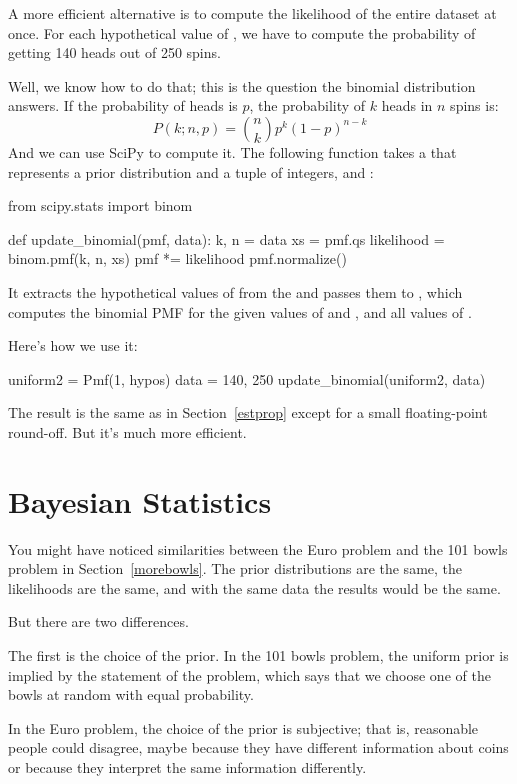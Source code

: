 \documentclass[12pt]{book}
\theoremstyle{exercise}
\begin{document}
A more efficient alternative is to compute the likelihood of the entire dataset at once.
For each hypothetical value of , we have to compute the probability of getting 140 heads out of 250 spins.

Well, we know how to do that; this is the question the binomial distribution answers.
If the probability of heads is $p$, the probability of $k$ heads in $n$ spins is:
%
\[ P(k; n, p) = \binom{n}{k} p^k (1-p)^{n-k} \]
%
And we can use SciPy to compute it.
The following function takes a  that represents a prior distribution and a tuple of integers,  and :

\begin{code}
from scipy.stats import binom

def update_binomial(pmf, data):
    k, n = data
    xs = pmf.qs
    likelihood = binom.pmf(k, n, xs)
    pmf *= likelihood
    pmf.normalize()
\end{code}

It extracts the hypothetical values of  from the  and passes them to , which computes the binomial PMF for the given values of  and , and all values of .

Here's how we use it:

\begin{code}
uniform2 = Pmf(1, hypos)
data = 140, 250
update_binomial(uniform2, data)
\end{code}

The result is the same as in Section~\ref{estprop} except for a small floating-point round-off.
But it's much more efficient.


\section{Bayesian Statistics}

You might have noticed similarities between the Euro problem and the 101 bowls problem in Section~\ref{morebowls}.
The prior distributions are the same, the likelihoods are the same, and with the same data the results would be the same.

But there are two differences.

The first is the choice of the prior.
In the 101 bowls problem, the uniform prior is implied by the statement of the problem, which says that we choose one of the bowls at random with equal probability.

In the Euro problem, the choice of the prior is subjective; that is, reasonable people could disagree, maybe because they have different information about coins or because they interpret the same information differently.
\end{document}

